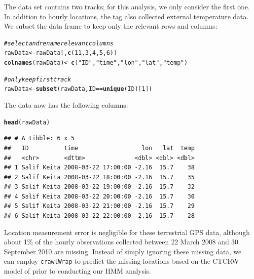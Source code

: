 \documentclass[12pt]{article}\usepackage[]{graphicx}\usepackage[]{xcolor}
\makeatletter
\newcommand{\hlnum}[1]{\textcolor[rgb]{0.686,0.059,0.569}{#1}}%
\newcommand{\hlsng}[1]{\textcolor[rgb]{0.192,0.494,0.8}{#1}}%
\newcommand{\hlcom}[1]{\textcolor[rgb]{0.678,0.584,0.686}{\textit{#1}}}%
\newcommand{\hlopt}[1]{\textcolor[rgb]{0,0,0}{#1}}%
\newcommand{\hldef}[1]{\textcolor[rgb]{0.345,0.345,0.345}{#1}}%
\newcommand{\hlkwb}[1]{\textcolor[rgb]{0.69,0.353,0.396}{#1}}%
\newcommand{\hlkwd}[1]{\textcolor[rgb]{0.737,0.353,0.396}{\textbf{#1}}}%
\newenvironment{kframe}{%
 \def\at@end@of@kframe{}%
 \ifinner\ifhmode%
  \def\at@end@of@kframe{\end{minipage}}%
  \begin{minipage}{\columnwidth}%
 \fi\fi%
 \def\FrameCommand##1{\hskip\@totalleftmargin \hskip-\fboxsep
 \colorbox{shadecolor}{##1}\hskip-\fboxsep
     \hskip-\linewidth \hskip-\@totalleftmargin \hskip\columnwidth}%
 \MakeFramed {\advance\hsize-\width
   \@totalleftmargin\z@ \linewidth\hsize
   \@setminipage}}%
 {\par\unskip\endMakeFramed%
 \at@end@of@kframe}
\newenvironment{knitrout}{}{} %
\makeatother
\begin{document}
The data set contains two tracks; for this analysis, we only consider the first one. In addition to hourly locations, the tag also collected external temperature data. We subset the data frame to keep only the relevant rows and columns:
\begin{knitrout}
\color{fgcolor}\begin{kframe}
\begin{alltt}
\hlcom{# select and rename relevant columns}
\hldef{rawData} \hlkwb{<-} \hldef{rawData[,}\hlkwd{c}\hldef{(}\hlnum{11}\hldef{,}\hlnum{3}\hldef{,}\hlnum{4}\hldef{,}\hlnum{5}\hldef{,}\hlnum{6}\hldef{)]}
\hlkwd{colnames}\hldef{(rawData)} \hlkwb{<-} \hlkwd{c}\hldef{(}\hlsng{"ID"}\hldef{,}\hlsng{"time"}\hldef{,}\hlsng{"lon"}\hldef{,}\hlsng{"lat"}\hldef{,}\hlsng{"temp"}\hldef{)}

\hlcom{# only keep first track}
\hldef{rawData} \hlkwb{<-} \hlkwd{subset}\hldef{(rawData,ID}\hlopt{==}\hlkwd{unique}\hldef{(ID)[}\hlnum{1}\hldef{])}
\end{alltt}
\end{kframe}
\end{knitrout}

The data now has the following columns:
\begin{knitrout}
\color{fgcolor}\begin{kframe}
\begin{alltt}
\hlkwd{head}\hldef{(rawData)}
\end{alltt}
\begin{verbatim}
## # A tibble: 6 x 5
##   ID          time                  lon   lat  temp
##   <chr>       <dttm>              <dbl> <dbl> <dbl>
## 1 Salif Keita 2008-03-22 17:00:00 -2.16  15.7    38
## 2 Salif Keita 2008-03-22 18:00:00 -2.16  15.7    35
## 3 Salif Keita 2008-03-22 19:00:00 -2.16  15.7    32
## 4 Salif Keita 2008-03-22 20:00:00 -2.16  15.7    30
## 5 Salif Keita 2008-03-22 21:00:00 -2.16  15.7    29
## 6 Salif Keita 2008-03-22 22:00:00 -2.16  15.7    28
\end{verbatim}
\end{kframe}
\end{knitrout}

Location measurement error is negligible for these terrestrial GPS data, although about 1\% of the hourly observations collected between 22 March 2008 and 30 September 2010 are missing. Instead of simply ignoring these missing data, we can employ \verb|crawlWrap| to predict the missing locations based on the CTCRW model of \cite{JohnsonEtAl2008} prior to conducting our HMM analysis.
\end{document}
